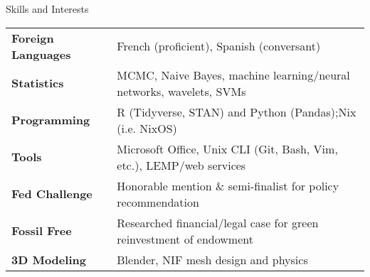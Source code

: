 \begin{rSection}{Skills and Interests}
\begin{tabular}{ @{} >{\bfseries}l @{\hspace{3ex}} l }
  Foreign Languages & French (proficient), Spanish (conversant) \\
  Statistics & MCMC, Naive Bayes, machine learning/neural networks, wavelets, SVMs \\ %
  Programming & R (Tidyverse, STAN) and Python (Pandas);\@ Nix (i.e. NixOS) \\
  Tools & Microsoft Office, Unix CLI (Git, Bash, Vim, etc.), LEMP/web services \\
  Fed Challenge & Honorable mention \& semi-finalist for policy recommendation \\
  Fossil Free & Researched financial/legal case for green reinvestment of endowment \\
  3D Modeling & Blender, NIF mesh design and physics
\end{tabular}
\end{rSection}
